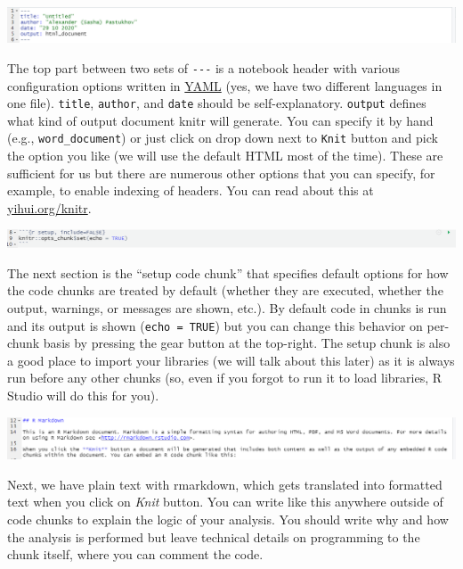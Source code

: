 \documentclass[
]{book}
\begin{document}
\begin{center}\includegraphics[width=1\linewidth]{images/notebook-header} \end{center}

The top part between two sets of \texttt{-\/-\/-} is a notebook header with various configuration options written in \href{https://yaml.org/}{YAML} (yes, we have two different languages in one file). \texttt{title}, \texttt{author}, and \texttt{date} should be self-explanatory. \texttt{output} defines what kind of output document knitr will generate. You can specify it by hand (e.g., \texttt{word\_document}) or just click on drop down next to \texttt{Knit} button and pick the option you like (we will use the default HTML most of the time). These are sufficient for us but there are numerous other options that you can specify, for example, to enable indexing of headers. You can read about this at \href{https://yihui.org/knitr/}{yihui.org/knitr}.

\begin{center}\includegraphics[width=1\linewidth]{images/notebook-setup} \end{center}

The next section is the ``setup code chunk'' that specifies default options for how the code chunks are treated by default (whether they are executed, whether the output, warnings, or messages are shown, etc.). By default code in chunks is run and its output is shown (\texttt{echo\ =\ TRUE}) but you can change this behavior on per-chunk basis by pressing the gear button at the top-right. The setup chunk is also a good place to import your libraries (we will talk about this later) as it is always run before any other chunks (so, even if you forgot to run it to load libraries, R Studio will do this for you).

\begin{center}\includegraphics[width=1\linewidth]{images/notebook-text} \end{center}

Next, we have plain text with rmarkdown, which gets translated into formatted text when you click on \emph{Knit} button. You can write like this anywhere outside of code chunks to explain the logic of your analysis. You should write why and how the analysis is performed but leave technical details on programming to the chunk itself, where you can comment the code.
\end{document}
